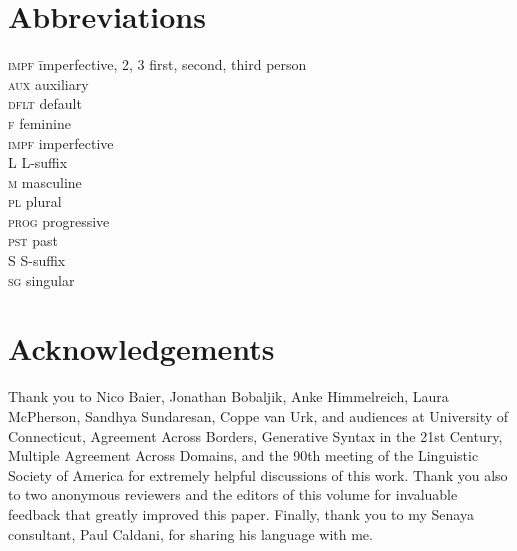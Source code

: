 \documentclass[output=paper
,modfonts
,nonflat]{langsci/langscibook}
\begin{document}
\section*{Abbreviations}

\begin{multicols}{2}
	\begin{tabbing}
		\textsc{impf}\hspace{5mm} \= imperfective, 2, 3 \> first, second, third person\\
\textsc{aux} \> auxiliary\\
\textsc{dflt} \> default\\
 \textsc{f} \> feminine\\
\textsc{impf} \> imperfective\\
 L \> L-suffix\\
 \textsc{m} \> masculine\\
 \textsc{pl} \> plural\\
 \textsc{prog} \> progressive\\
 \textsc{pst} \> past\\
 S \> S-suffix\\
 \textsc{sg} \> singular\\
	\end{tabbing} 
\end{multicols}

\section*{Acknowledgements}

Thank you to Nico Baier, Jonathan Bobaljik, Anke Himmelreich, Laura McPherson, Sandhya Sundaresan, Coppe van Urk, and audiences at University of Connecticut, Agreement Across Borders, Generative Syntax in the 21st Century, Multiple Agreement Across Domains, and the 90th meeting of the Linguistic Society of America for extremely helpful discussions of this work. Thank you also to two anonymous reviewers and the editors of this volume for invaluable feedback that greatly improved this paper. Finally, thank you to my Senaya consultant, Paul Caldani, for sharing his language with me.

{\sloppy\printbibliography[heading=subbibliography,notkeyword=this]}
\end{document}
